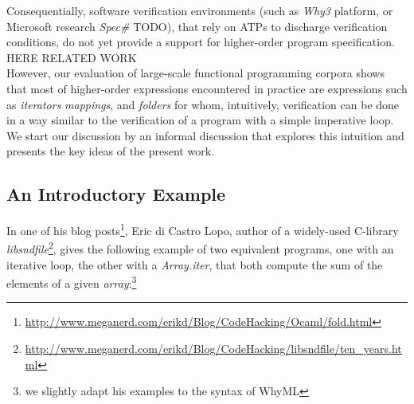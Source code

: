 \documentclass[a4paper,11pt,oneside]{article}
\theoremstyle{plain}
\newcommand{\meganerd}	
	{\url{http://www.meganerd.com/erikd/Blog/CodeHacking/Ocaml/fold.html}}
\newcommand{\libsndfile}
{\url{
http://www.meganerd.com/erikd/Blog/CodeHacking/libsndfile/ten_years.html}}
\begin{document}
	Consequentially, software verification environments (such as \textit{Why3} platform, or Microsoft research \textit{Spec\#} TODO), that rely on ATPs to discharge verification conditions, do not yet provide a support for higher-order program specification. \\

  HERE RELATED WORK \\

  However, our evaluation of large-scale functional programming corpora shows that most of higher-order expressions encountered in practice are expressions such as \textit{iterators} \textit{mappings}, and \textit{folders} for whom, intuitively, verification can be done in a way similar to the verification of a program with a simple imperative loop.
  We start our discussion by an informal discussion that explores this intuition and presents the key ideas of the present work. 
  

%	

	


	
	
	
\subsection*{An Introductory Example}		

	
	
	In one of his blog posts\footnote{\meganerd}, Eric di Castro Lopo, author of a widely-used C-library \textit{libsndfile}\footnote{\libsndfile}, gives the following example of two equivalent programs, one with an iterative loop, the other with a \textit{Array.iter}, that both compute the sum of the elements of a given \textit{array}:\vspace{-0.5cm}\footnote{we slightly adapt his examples to the syntax of WhyML} 
\end{document}
